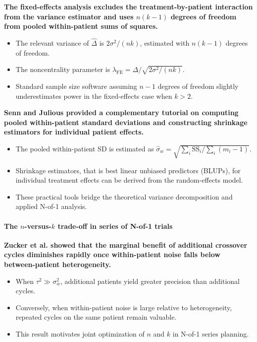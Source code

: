 \documentclass[
  11pt,
]{article}
\begin{document}
\textbf{The fixed-effects analysis excludes the treatment-by-patient interaction from the variance estimator and uses $n(k-1)$ degrees of freedom from pooled within-patient sums of squares.}

\begin{itemize}\setlength{\itemsep}{2pt}\setlength{\parskip}{0pt}
\item The relevant variance of $\hat{\Delta}$ is $2\sigma^2 / (nk)$, estimated with $n(k-1)$ degrees of freedom.
\item The noncentrality parameter is $\lambda_{\text{FE}} = \Delta / \sqrt{2\sigma^2/(nk)}$.
\item Standard sample size software assuming $n-1$ degrees of freedom slightly underestimates power in the fixed-effects case when $k > 2$.
\end{itemize}

\textbf{Senn and Julious provided a complementary tutorial on computing pooled within-patient standard deviations and constructing shrinkage estimators for individual patient effects.}

\begin{itemize}\setlength{\itemsep}{2pt}\setlength{\parskip}{0pt}
\item The pooled within-patient SD is estimated as $\hat{\sigma}_w = \sqrt{\sum_i \text{SS}_i / \sum_i(m_i - 1)}$.
\item Shrinkage estimators, that is best linear unbiased predictors (BLUPs), for individual treatment effects can be derived from the random-effects model.
\item These practical tools bridge the theoretical variance decomposition and applied N-of-1 analysis.
\end{itemize}

\paragraph{\texorpdfstring{The \(n\)-versus-\(k\) trade-off in series of N-of-1 trials}{The n-versus-k trade-off in series of N-of-1 trials}}\label{the-n-versus-k-trade-off-in-series-of-n-of-1-trials}

\textbf{Zucker et al. showed that the marginal benefit of additional crossover cycles diminishes rapidly once within-patient noise falls below between-patient heterogeneity.}

\begin{itemize}\setlength{\itemsep}{2pt}\setlength{\parskip}{0pt}
\item When $\tau^2 \gg \sigma^2_w$, additional patients yield greater precision than additional cycles.
\item Conversely, when within-patient noise is large relative to heterogeneity, repeated cycles on the same patient remain valuable.
\item This result motivates joint optimization of $n$ and $k$ in N-of-1 series planning.
\end{itemize}
\end{document}
